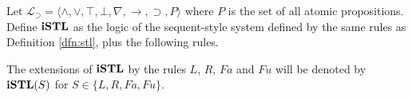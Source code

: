 \begin{dfn}\label{dfn:istl}
	Let $\mathcal{L}_\supset=\langle \wedge, \vee, \top, \bot, \nabla, \rightarrow, \supset, P \rangle$ where $P$ is the set of all atomic propositions. Define $\istl$ as the logic of the sequent-style system defined by the same rules as Definition \ref{dfn:stl}, plus the following rules.
\end{dfn}
\begin{multicols}{2}
  \begin{prooftree}
  \end{prooftree}
  \columnbreak
  \begin{prooftree}
  \end{prooftree}
\end{multicols}
The extensions of $\istl$ by the rules $L$, $R$, $Fa$ and $Fu$ will be denoted by $\istl(S)$ for $S \in \{ L, R, Fa, Fu \}$.